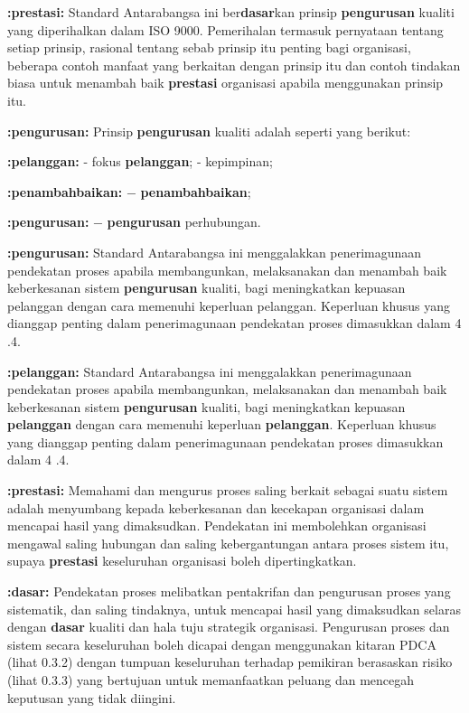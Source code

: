\documentclass{article}
\begin{document}
\textbf{:prestasi:} Standard Antarabangsa ini ber\textbf{dasar}kan prinsip \textbf{pengurusan} kualiti yang diperihalkan dalam
ISO 9000. Pemerihalan termasuk pernyataan tentang setiap prinsip, rasional tentang sebab
prinsip itu penting bagi organisasi, beberapa contoh manfaat yang berkaitan dengan prinsip
itu dan contoh tindakan biasa untuk menambah baik \textbf{prestasi} organisasi apabila
menggunakan prinsip itu.

\textbf{:pengurusan:} Prinsip \textbf{pengurusan} kualiti adalah seperti yang berikut:

\textbf{:pelanggan:} - fokus \textbf{pelanggan};
- kepimpinan;

\textbf{:penambahbaikan:} − \textbf{penambahbaikan};

\textbf{:pengurusan:} − \textbf{pengurusan} perhubungan.

\textbf{:pengurusan:} Standard Antarabangsa ini menggalakkan penerimagunaan pendekatan proses apabila
membangunkan, melaksanakan dan menambah baik keberkesanan sistem \textbf{pengurusan}
kualiti, bagi meningkatkan kepuasan pelanggan dengan cara memenuhi keperluan
pelanggan. Keperluan khusus yang dianggap penting dalam penerimagunaan pendekatan
proses dimasukkan dalam 4 .4.

\textbf{:pelanggan:} Standard Antarabangsa ini menggalakkan penerimagunaan pendekatan proses apabila
membangunkan, melaksanakan dan menambah baik keberkesanan sistem \textbf{pengurusan}
kualiti, bagi meningkatkan kepuasan \textbf{pelanggan} dengan cara memenuhi keperluan
\textbf{pelanggan}. Keperluan khusus yang dianggap penting dalam penerimagunaan pendekatan
proses dimasukkan dalam 4 .4.

\textbf{:prestasi:} Memahami dan mengurus proses saling berkait sebagai suatu sistem adalah menyumbang
kepada keberkesanan dan kecekapan organisasi dalam mencapai hasil yang dimaksudkan.
Pendekatan ini membolehkan organisasi mengawal saling hubungan dan saling
kebergantungan antara proses sistem itu, supaya \textbf{prestasi} keseluruhan organisasi boleh
dipertingkatkan.

\textbf{:dasar:} Pendekatan proses melibatkan pentakrifan dan pengurusan proses yang sistematik, dan
saling tindaknya, untuk mencapai hasil yang dimaksudkan selaras dengan \textbf{dasar} kualiti dan
hala tuju strategik organisasi. Pengurusan proses dan sistem secara keseluruhan boleh
dicapai dengan menggunakan kitaran PDCA (lihat 0.3.2) dengan tumpuan keseluruhan
terhadap pemikiran berasaskan risiko (lihat 0.3.3) yang bertujuan untuk memanfaatkan
peluang dan mencegah keputusan yang tidak diingini.
\end{document}
